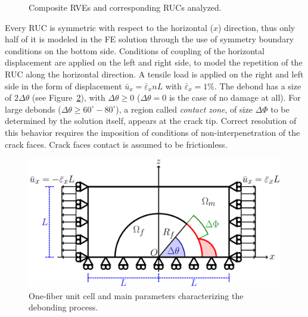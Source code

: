 \documentclass[12pt,a4paper]{article}
\begin{document}
\begin{figure}[!h]
\caption{Composite RVEs and corresponding RUCs analyzed.}\label{fig:rves}
\end{figure}

Every RUC is symmetric with respect to the horizontal ($x$) direction, thus only half of it is modeled in the FE solution through the use of symmetry boundary conditions on the bottom side. Conditions of coupling of the horizontal displacement are applied on the left and right side, to model the repetition of the RUC along the horizontal direction. A tensile load is applied on the right and left side in the form of displacement $\bar{u}_{x}=\bar{\varepsilon}_{x}nL$ with $\bar{\varepsilon}_{x}=1\%$. The debond has a size of $2\Delta\theta$ (see Figure~\ref{fig:ruc}), with $\Delta\theta\geq0$ ($\Delta\theta=0$ is the case of no damage at all). For large debonds ($\Delta\theta\geq 60^{\circ}-80^{\circ}$), a region called \emph{contact zone}, of size $\Delta\Phi$ to be determined by the solution itself, appears at the crack tip. Correct resolution of this behavior requires the imposition of conditions of non-interpenetration of the crack faces. Crack faces contact is assumed to be frictionless.

\begin{figure}[!h]
\centering
        \includegraphics[height=0.25\textheight]{RUC.pdf}
\caption{One-fiber unit cell and main parameters characterizing the debonding process.}\label{fig:ruc}
\end{figure}
\end{document}
